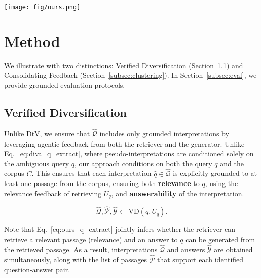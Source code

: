 \begin{figure*}[tbp]
\centering
\texttt{[image: fig/ours.png]}
\caption{
Illustration of the full pipeline of \ours: Verified diversification (Section~\ref{subsec:extraction}) followed by consolidation phase (Section~\ref{subsec:clustering}).
On the right, yellow and blue dots represent embeddings of generated interpretations and their answers, embedded together after concatenation, while yellow color denotes medoids, or representatives chosen from each cluster.
}
\label{fig:ours}
\end{figure*}

\section{Method}
\label{sec:method}

We illustrate \ours with two distinctions:
Verified Diversification (Section~\ref{subsec:extraction})
and 
Consolidating Feedback (Section~\ref{subsec:clustering}).
In Section~\ref{subsec:eval}, we provide grounded evaluation protocols.




\subsection{Verified Diversification}
\label{subsec:extraction}

Unlike DtV,
we ensure that $\hat{\mathcal{Q}}$ includes only grounded interpretations by leveraging agentic feedback from both the retriever and the generator.
Unlike Eq.~\ref{eq:diva_q_extract}, where pseudo-interpretations are conditioned solely on the ambiguous query $q$, our approach conditions on both the query $q$ and the corpus $C$.
This ensures that each interpretation $\hat{q} \in \hat{\mathcal{Q}}$ is explicitly grounded to at least one passage from the corpus, ensuring 
both \textbf{relevance} to $q$, using the relevance feedback of retrieving $U_q$, and \textbf{answerability} of the interpretation.

\begin{equation}
\hat{\mathcal{Q}},
\hat{\mathcal{P}},
\hat{\mathcal{Y}} \leftarrow 
\textrm{VD}(q,U_q).
\label{eq:ours_q_extract}
\end{equation}




Note that Eq.~\ref{eq:ours_q_extract}
jointly infers
whether the retriever can retrieve a relevant passage (relevance) and an answer to $q$ can be generated from the retrieved passage.
As a result,
interpretations $\hat{\mathcal{Q}}$ and answers $\hat{\mathcal{Y}}$ are obtained simultaneously, along with the list of passages $\hat{\mathcal{P}}$ that support each identified question-answer pair.


